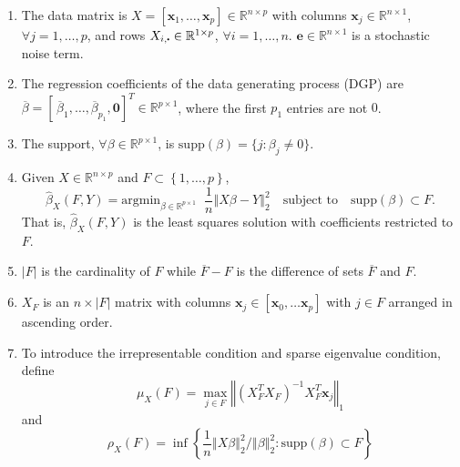 \documentclass[11pt,review,authoryear]{elsarticle}
\begin{document}
\begin{appendices}
\begin{enumerate}
  \item     The data matrix is $X = \left[ \mathbf{x}_1, \ldots,\mathbf{x}_p \right] \in \mathbb{R}^{n \times p}$ with columns $\mathbf{x}_j \in \mathbb{R}^{n \times 1}$, $\forall j=1,\ldots,p$, and rows $ X_{i,\bigcdot} \in \mathbb{R}^{1 \times p}$, $\forall i = 1,\ldots,n$. $\mathbf{e}\in \mathbb{R}^{n\times 1}$ is a stochastic noise term.
  \item     The regression coefficients of the data generating process (DGP) are $\overline{\beta} = \left[\,\overline{\beta}_1, \ldots, \overline{\beta}_{p_1}, \mathbf{0} \right]^T \in \mathbb{R}^{p\times 1}$, where the first $p_1$ entries are not $0$.
  \item     The support, $\forall \beta \in \mathbb{R}^{p \times 1}$, is $\mathrm{supp}(\beta) = \{ j : \beta_j \neq 0 \} $.
  \item     Given $X \in \mathbb{R}^{n \times p}$ and $F \subset \left\{1, \ldots, p \right\}$,
  \begin{displaymath}
    \widehat{\beta}_{X} \left( F,Y \right) =
    \mathrm{argmin}_{ \beta \in \mathbb{R}^{p \times 1}} \;\;
    \frac{1}{n}\left\Vert X\beta - Y\right\Vert_{2}^{2}
    \quad\mbox{subject to}\quad \mathrm{supp}(\beta)\subset F.
  \end{displaymath}
  That is, $\widehat{\beta}_{X}\left(F,Y\right)$ is the least squares solution with coefficients restricted to $F$.
  \item $\left\vert F \right\vert$ is the cardinality of $F$ while $\overline{F}-F$ is the difference of sets $\overline{F}$ and $F$.
  \item $X_F$ is an $n \times \left\vert F \right\vert$ matrix with columns $\mathbf{x}_j \in \left[ \mathbf{x}_0, \ldots \mathbf{x}_p \right]$ with $j\in F$ arranged in ascending order.
  \item To introduce the irrepresentable condition and sparse eigenvalue condition, define
  \begin{displaymath}
    \mu_{X}\left(F\right)=\max_{j\in F}\left\Vert \left(X_{F}^{T}X_{F}\right)^{-1}X_{F}^{T}\mathbf{x}_{j}\right\Vert _{1}
  \end{displaymath}
  and
  \begin{displaymath}
    \rho_{X}\left(F\right)=\inf\left\{ \frac{1}{n}\left\Vert X\beta\right\Vert _{2}^{2}/\left\Vert \beta\right\Vert _{2}^{2}:\mathrm{supp}\left(\beta\right)\subset F\right\}
  \end{displaymath}

\end{enumerate}
\end{appendices}
\end{document}
